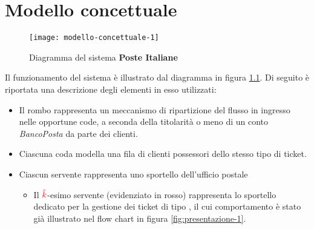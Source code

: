 \chapter{Modello concettuale}\label{chp:modello-concettuale}
\begin{figure}[ht]
\centering
\texttt{[image: modello-concettuale-1]}
\caption{Diagramma del sistema \textbf{Poste Italiane}}
\label{fig:modello-concettuale-1}
\end{figure}

Il funzionamento del sistema è illustrato dal diagramma in figura \ref{fig:modello-concettuale-1}. Di seguito è riportata una descrizione degli elementi in esso utilizzati:
\begin{itemize}
\item Il rombo rappresenta un meccanismo di ripartizione del flusso in ingresso nelle opportune code, a seconda della titolarità o meno di un conto \textsl{BancoPosta} da parte dei clienti.
\item Ciascuna coda modella una fila di clienti possessori dello stesso tipo di ticket.
\item Ciascun servente rappresenta uno sportello dell'ufficio postale
\begin{itemize}
\item Il ${\color{red}\hat{k}}$-esimo servente (evidenziato in {\color{red} rosso}) rappresenta lo sportello dedicato per la gestione dei ticket di tipo \sr{}, il cui comportamento è stato già illustrato nel flow chart in figura \ref{fig:presentazione-1}.
\end{itemize}
\end{itemize}

